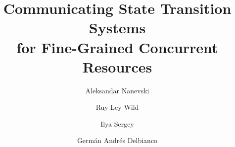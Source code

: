 \documentclass[runningheads]{llncs}
\begin{document}
\title{Communicating State Transition Systems \\
for Fine-Grained Concurrent Resources}



\author{Aleksandar Nanevski \and
        Ruy Ley-Wild \and
        Ilya Sergey \and
        Germ\'{a}n Andr\'{e}s Delbianco}



\maketitle











% 
% 
% 
% 
% 
\end{document}
